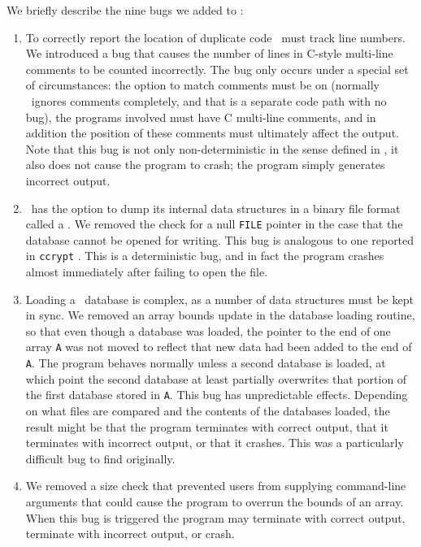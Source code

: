 We briefly describe the nine bugs we added to \moss:
\begin{enumerate}
\item To correctly report the location of duplicate code \moss\ must
track line numbers.  We introduced a bug that causes the number of
lines in C-style multi-line comments to be counted incorrectly.  The
bug only occurs under a special set of circumstances: the option to
match comments must be on (normally \moss\ ignores comments
completely, and that is a separate code path with no bug), the
programs involved must have C multi-line comments, and in addition the
position of these comments must ultimately affect the output.
Note that this bug is not only non-deterministic in
the sense defined in , it also does not
cause the program to crash; the program simply generates incorrect
output.

\item \moss\ has the option to dump its internal data structures in a
binary file format called a .  We removed the check for a
null {\tt FILE} pointer in the case that the database cannot be opened
for writing.  This bug is analogous to one reported in {\tt ccrypt}
\cite{Selinger:2003:cqual}.  This is a deterministic bug, and in fact the
program crashes almost immediately after failing to open the file.

\item Loading a \moss\ database is complex, as a number of data
structures must be kept in sync.  We removed an array bounds update
in the database loading routine, so that even though a database was
loaded, the pointer to the end of one array {\tt A} was not moved to
reflect that new data had been added to the end of {\tt A}. The
program behaves normally unless a second database is loaded, at which
point the second database at least partially overwrites that portion
of the first database stored in {\tt A}.  This bug has unpredictable
effects.  Depending on what files are compared and the contents of the
databases loaded, the result might be that the program terminates with
correct output, that it terminates with incorrect output, or that it
crashes.  This was a particularly difficult bug to find originally.

\item We removed a size check that prevented users from supplying command-line arguments
that could cause the program to overrun the bounds of an array.  When
this bug is triggered the program may terminate with correct output,
terminate with incorrect output, or crash.



\end{enumerate}
